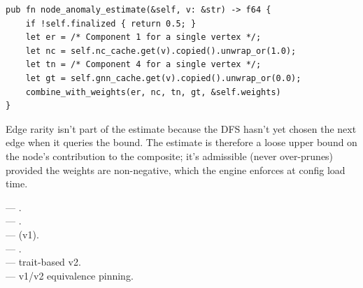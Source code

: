 \begin{lstlisting}[style=rust]
pub fn node_anomaly_estimate(&self, v: &str) -> f64 {
    if !self.finalized { return 0.5; }
    let er = /* Component 1 for a single vertex */;
    let nc = self.nc_cache.get(v).copied().unwrap_or(1.0);
    let tn = /* Component 4 for a single vertex */;
    let gt = self.gnn_cache.get(v).copied().unwrap_or(0.0);
    combine_with_weights(er, nc, tn, gt, &self.weights)
}
\end{lstlisting}

Edge rarity isn't part of the estimate because the DFS hasn't yet
chosen the next edge when it queries the bound. The estimate is
therefore a loose upper bound on the node's contribution to the
composite; it's admissible (never over-prunes) provided the weights
are non-negative, which the engine enforces at config load time.

\begin{inthecode}
 ---
.\\
 ---
.\\
 ---
 (v1).\\
 ---
.\\
 --- trait-based v2.\\
 ---
v1/v2 equivalence pinning.
\end{inthecode}

